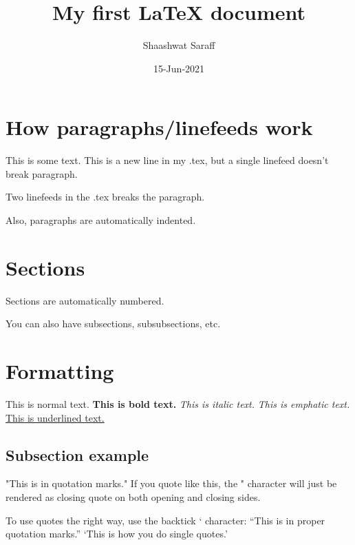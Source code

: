 \documentclass{article}
\author{Shaashwat Saraff}
\title{My first {\LaTeX} document}
\date{15-Jun-2021}
\begin{document}
  \maketitle


  \section{How paragraphs/linefeeds work \label{paragraph_sec}}

    This is some text.
    This is a new line in my .tex, but a single linefeed doesn't break paragraph.

    Two linefeeds in the .tex breaks the paragraph.

    Also, paragraphs are automatically indented. 


  \section{Sections \label{sections_sec}}

    Sections are automatically numbered.

    You can also have subsections, subsubsections, etc.


  \section{Formatting \label{formatting_sec}}

    This is normal text. 
    \textbf{This is bold text.} 
    \textit{This is italic text.} 
    \emph{This is emphatic text.} 
    \underline{This is underlined text.}


    \subsection{Subsection example \label{reflab_subsections_sec}}

      "This is in quotation marks." If you quote like this, the " character will just be rendered as closing quote on both opening and closing sides. 

      To use quotes the right way, use the backtick ` character:
      ``This is in proper quotation marks.'' `This is how you do single quotes.'
\end{document}
